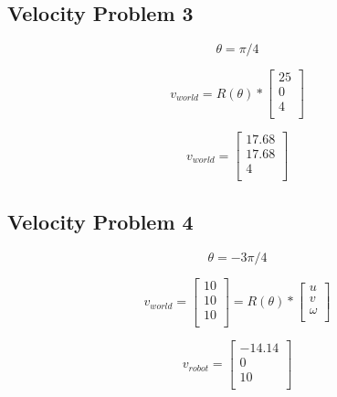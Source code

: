 \subsection{Velocity Problem 3}
$$ 
\theta = \pi/4
$$

$$
v_{world} = R(\theta)* 
\begin{bmatrix} 
25 \\
0 \\
4 \\
\end{bmatrix}
$$

$$
v_{world} = 
\begin{bmatrix} 
17.68 \\
17.68 \\
4 \\
\end{bmatrix}
$$


\subsection{Velocity Problem 4}
$$ 
\theta = -3\pi/4
$$

$$
v_{world} = 
\begin{bmatrix} 
10 \\
10 \\
10 \\
\end{bmatrix} 
=
R(\theta)* 
\begin{bmatrix} 
u \\
v \\
\omega \\
\end{bmatrix}
$$

$$
v_{robot} = 
\begin{bmatrix} 
-14.14 \\
0 \\
10 \\
\end{bmatrix}
$$
